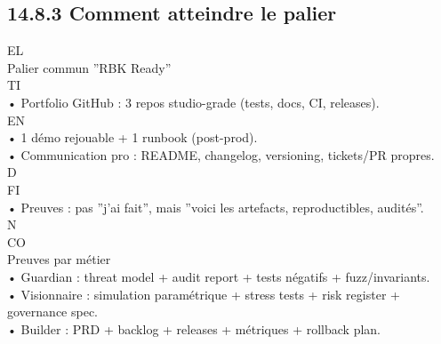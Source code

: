\subsection{14.8.3 Comment atteindre le palier}
\vspace{0.5em}
\vspace{0.5em}
\vspace{0.5em}
\vspace{0.5em}
EL\\
Palier commun ”RBK Ready”\\
\vspace{0.5em}
\vspace{0.5em}
\vspace{0.5em}
\vspace{0.5em}
TI\\
• Portfolio GitHub : 3 repos studio-grade (tests, docs, CI, releases).\\
\vspace{0.5em}
\vspace{0.5em}
\vspace{0.5em}
\vspace{0.5em}
EN\\
• 1 démo rejouable + 1 runbook (post-prod).\\
\vspace{0.5em}
• Communication pro : README, changelog, versioning, tickets/PR propres.\\
\vspace{0.5em}
\vspace{0.5em}
\vspace{0.5em}
\vspace{0.5em}
D\\
FI\\
• Preuves : pas ”j’ai fait”, mais ”voici les artefacts, reproductibles, audités”.\\
\vspace{0.5em}
N\\
CO\\
Preuves par métier\\
\vspace{0.5em}
• Guardian : threat model + audit report + tests négatifs + fuzz/invariants.\\
\vspace{0.5em}
• Visionnaire : simulation paramétrique + stress tests + risk register + governance spec.\\
\vspace{0.5em}
• Builder : PRD + backlog + releases + métriques + rollback plan.\\
